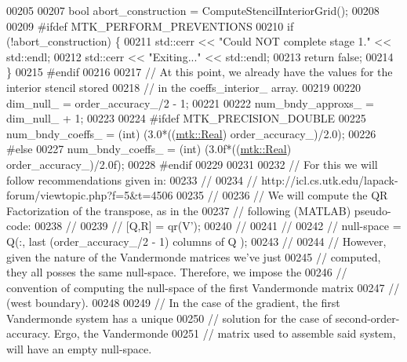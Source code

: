 \begin{DoxyCode}
00205 
00207   \textcolor{keywordtype}{bool} abort\_construction = ComputeStencilInteriorGrid();
00208 
00209 \textcolor{preprocessor}{  #ifdef MTK\_PERFORM\_PREVENTIONS}
00210   \textcolor{keywordflow}{if} (!abort\_construction) \{
00211     std::cerr << \textcolor{stringliteral}{"Could NOT complete stage 1."} << std::endl;
00212     std::cerr << \textcolor{stringliteral}{"Exiting..."} << std::endl;
00213     \textcolor{keywordflow}{return} \textcolor{keyword}{false};
00214   \}
00215 \textcolor{preprocessor}{  #endif}
00216 
00217   \textcolor{comment}{// At this point, we already have the values for the interior stencil stored}
00218   \textcolor{comment}{// in the coeffs\_interior\_ array.}
00219 
00220   dim\_null\_ = order\_accuracy\_/2 - 1;
00221 
00222   num\_bndy\_approxs\_ = dim\_null\_ + 1;
00223 
00224 \textcolor{preprocessor}{  #ifdef MTK\_PRECISION\_DOUBLE}
00225   num\_bndy\_coeffs\_ = (int) (3.0*((\hyperlink{group__c01-roots_gac080bbbf5cbb5502c9f00405f894857d}{mtk::Real}) order\_accuracy\_)/2.0);
00226 \textcolor{preprocessor}{  #else}
00227   num\_bndy\_coeffs\_ = (int) (3.0f*((\hyperlink{group__c01-roots_gac080bbbf5cbb5502c9f00405f894857d}{mtk::Real}) order\_accuracy\_)/2.0f);
00228 \textcolor{preprocessor}{  #endif}
00229 
00231 
00232   \textcolor{comment}{// For this we will follow recommendations given in:}
00233   \textcolor{comment}{//}
00234   \textcolor{comment}{// http://icl.cs.utk.edu/lapack-forum/viewtopic.php?f=5&t=4506}
00235   \textcolor{comment}{//}
00236   \textcolor{comment}{// We will compute the QR Factorization of the transpose, as in the}
00237   \textcolor{comment}{// following (MATLAB) pseudo-code:}
00238   \textcolor{comment}{//}
00239   \textcolor{comment}{// [Q,R] = qr(V'); %
00240   \textcolor{comment}{// %
00241   \textcolor{comment}{//}
00242   \textcolor{comment}{// null-space = Q(:, last (order\_accuracy\_/2 - 1) columns of Q );}
00243   \textcolor{comment}{//}
00244   \textcolor{comment}{// However, given the nature of the Vandermonde matrices we've just}
00245   \textcolor{comment}{// computed, they all posses the same null-space. Therefore, we impose the}
00246   \textcolor{comment}{// convention of computing the null-space of the first Vandermonde matrix}
00247   \textcolor{comment}{// (west boundary).}
00248 
00249   \textcolor{comment}{// In the case of the gradient, the first Vandermonde system has a unique}
00250   \textcolor{comment}{// solution for the case of second-order-accuracy. Ergo, the Vandermonde}
00251   \textcolor{comment}{// matrix used to assemble said system, will have an empty null-space.}
}}
\end{DoxyCode}
